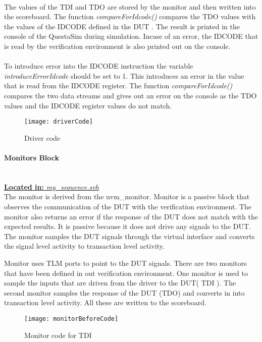\documentclass[a4paper,11pt]{article}
\begin{document}
 \\
The values of the TDI and TDO are stored by the monitor and then written into the scoreboard. The function \textit{compareForIdcode()} compares the TDO values with the values of the IDCODE defined in the DUT . The result is printed in the console of the QuestaSim during simulation. Incase of an error, the IDCODE that is read by the verification environment is also printed out on the console. \\
 \\
 To introduce error into the IDCODE instruction the variable \textit{introduceErrorIdcode} should be set to 1. This introduces an error in the value that is read from the IDCODE register. The function \textit{compareForIdcode()} compares the two data streams and gives out an error on the console as the TDO values and the IDCODE register values do not match.

\begin{figure}[ht]
\centering
\texttt{[image: driverCode]}
\caption{Driver code}
\end{figure}


\FloatBarrier
\paragraph{Monitors Block}\mbox{}\\
\underline{\textbf{Located in:} \textit{my\_sequence.svh}}\\
The monitor is derived from the uvm\_monitor. Monitor is a passive block that observes the communication of the DUT with the verification environment. The monitor also returns an error if the response of the DUT does not match with the expected results. It is passive because it does not drive any signals to the DUT. The monitor samples the DUT signals through the virtual interface and converts the signal level activity to transaction level activity.

Monitor uses TLM ports to point to the DUT signals. There are two monitors that have been defined in out verification environment. One monitor is used to sample the inputs that are driven from the driver to the DUT( TDI ). The second monitor samples the response of the DUT (TDO) and converts in into transaction level activity. All these are written to the scoreboard.


\begin{figure}[ht]
\centering
\texttt{[image: monitorBeforeCode]}
\caption{Monitor code for TDI}
\end{figure}
\end{document}
